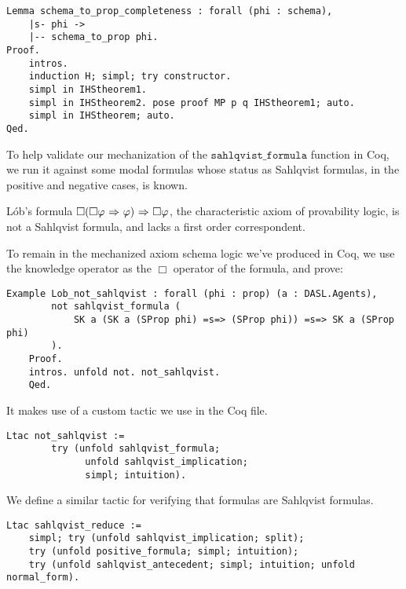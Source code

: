 \begin{tcolorbox}
	\begin{lstlisting}[language=Coq]
Lemma schema_to_prop_completeness : forall (phi : schema),
	|s- phi ->
	|-- schema_to_prop phi.
Proof.
	intros.
	induction H; simpl; try constructor.
	simpl in IHStheorem1.
	simpl in IHStheorem2. pose proof MP p q IHStheorem1; auto.
	simpl in IHStheorem; auto.
Qed.
	\end{lstlisting}
\end{tcolorbox}

To help validate our mechanization of the $\mathtt{sahlqvist\_formula}$ function in Coq, we run it against some modal formulas whose status as Sahlqvist formulas, in the positive and negative cases, is known.

L\'ob's formula $\Box(\Box \varphi {\ \Rightarrow \ } \varphi) {\ \Rightarrow \ } \Box \varphi$, the characteristic axiom of provability logic, is not a Sahlqvist formula, and lacks a first order correspondent\cite{Boolos}.

To remain in the mechanized axiom schema logic we've produced in Coq, we use the knowledge operator as the $\Box$ operator of the formula, and prove:

\begin{tcolorbox}
	\begin{lstlisting}[language=Coq]
	Example Lob_not_sahlqvist : forall (phi : prop) (a : DASL.Agents),
		not sahlqvist_formula (
			SK a (SK a (SProp phi) =s=> (SProp phi)) =s=> SK a (SProp phi)
		).
	Proof.
	intros. unfold not. not_sahlqvist. 
	Qed.
	\end{lstlisting}
\end{tcolorbox}

It makes use of a custom tactic we use in the Coq file.

\begin{tcolorbox}
	\begin{lstlisting}[language=Coq]
	Ltac not_sahlqvist := 
		try (unfold sahlqvist_formula; 
			  unfold sahlqvist_implication; 
			  simpl; intuition).
	\end{lstlisting}
\end{tcolorbox}

We define a similar tactic for verifying that formulas are Sahlqvist formulas.

\begin{tcolorbox}
	\begin{lstlisting}[language=Coq]
	Ltac sahlqvist_reduce := 
	simpl; try (unfold sahlqvist_implication; split);
	try (unfold positive_formula; simpl; intuition);
	try (unfold sahlqvist_antecedent; simpl; intuition; unfold normal_form).
	\end{lstlisting}
\end{tcolorbox}


